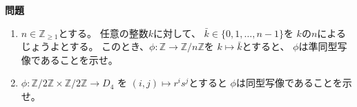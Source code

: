 \documentclass[12pt,b5paper]{ltjsarticle}
\begin{document}
\hrulefill
\textbf{問題}
\hrulefill

\begin{enumerate}
 \item
      $n\in\mathbb{Z}_{\geq 1}$とする。
      任意の整数$k$に対して、
      $\bar{k}\in\{0,1,\dots,n-1\}$を
      $k$の$n$によるじょうよとする。
      このとき、$\phi:\mathbb{Z}\to\mathbb{Z}/n\mathbb{Z}$を
      $k\mapsto \bar{k}$とすると、
      $\phi$は準同型写像であることを示せ。
      
 \item
      $\phi:\mathbb{Z}/2\mathbb{Z}\times\mathbb{Z}/2\mathbb{Z}\to D_{4}$
      を $(i,j)\mapsto r^is^j$とすると
      $\phi$は同型写像であることを示せ。
\end{enumerate}
\end{document}
